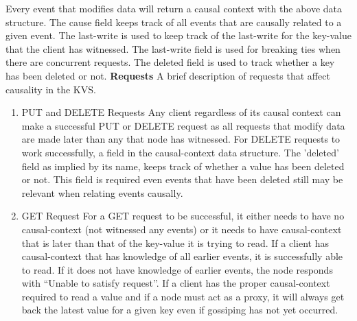 \documentclass[12pt]{article}
\begin{document}
Every event that modifies data will return a causal context with the above data structure. The cause field keeps track of all events that are causally related to a given event. The last-write is used to keep track of the last-write for the key-value that the client has witnessed. The last-write field is used for breaking ties when there are concurrent requests. The deleted field is used to track whether a key has been deleted or not.
\newline
\newline
\textbf{Requests}
\newline
A brief description of requests that affect causality in the KVS.
\begin{enumerate}
\item{PUT and DELETE Requests}
\newline
Any client regardless of its causal context can make a successful PUT or DELETE request as all requests that modify data are made later than any that node has witnessed.  For DELETE requests to work successfully, a field in the causal-context data structure. The 'deleted' field as implied by its name, keeps track of whether a value has been deleted or not. This field is required even events that have been deleted still may be relevant when relating events causally. 

\item{GET Request}
\newline
For a GET request to be successful, it either needs to have no causal-context (not witnessed any events) or it needs to have causal-context that is later than that of the key-value it is trying to read. If a client has causal-context that has knowledge of all earlier events, it is successfully able to read. If it does not have knowledge of earlier events, the node responds with “Unable to satisfy request”. If a client has the proper causal-context required to read a value and if a node must act as a proxy, it will always get back the latest value for a given key even if gossiping has not yet occurred.
\end{enumerate}
\end{document}
